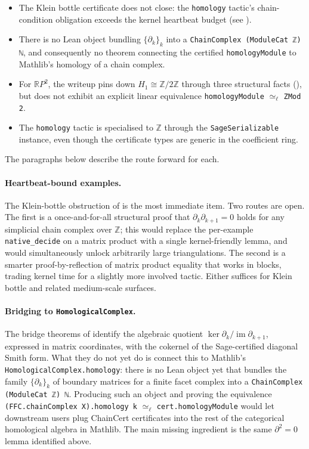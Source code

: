 \documentclass[11pt]{article}
\theoremstyle{plain}
\theoremstyle{definition}
\theoremstyle{remark}
\newcommand{\lean}[1]{\lstinline[language=lean]|#1|}
\begin{document}
\begin{itemize}
\item The Klein bottle certificate does not close: the \lean{homology}
tactic's chain-condition obligation exceeds the kernel heartbeat budget
(see ).
\item There is no Lean object bundling \(\{\partial_k\}_k\) into a
\lean{ChainComplex (ModuleCat ℤ) ℕ}, and consequently no theorem
connecting the certified \lean{homologyModule} to Mathlib's homology
of a chain complex.
\item For \(\mathbb{R}P^2\), the writeup pins down
\(H_1\cong\mathbb{Z}/2\mathbb{Z}\) through three structural facts
(), but does not exhibit an explicit
linear equivalence \lean{homologyModule} \(\simeq_\ell\) \lean{ZMod 2}.
\item The \lean{homology} tactic is specialised to \(\mathbb{Z}\) through
the \lean{SageSerializable} instance, even though the certificate types
are generic in the coefficient ring.
\end{itemize}

The paragraphs below describe the route forward for each.

\paragraph{Heartbeat-bound examples.}
The Klein-bottle obstruction of  is the most
immediate item. Two routes are open. The first is a once-and-for-all
structural proof that \(\partial_k\partial_{k+1} = 0\) holds for any
simplicial chain complex over \(\mathbb{Z}\); this would replace the
per-example \texttt{native\_decide} on a matrix product with a single
kernel-friendly lemma, and would simultaneously unlock arbitrarily large
triangulations. The second is a smarter proof-by-reflection of matrix
product equality that works in blocks, trading kernel time for a slightly
more involved tactic. Either suffices for Klein bottle and related
medium-scale surfaces.

\paragraph{Bridging to \texttt{HomologicalComplex}.}
The bridge theorems of  identify the algebraic quotient
\(\ker\partial_k / \operatorname{im}\partial_{k+1}\), expressed in matrix
coordinates, with the cokernel of the Sage-certified diagonal Smith form.
What they do not yet do is connect this to Mathlib's
\lean{HomologicalComplex.homology}: there is no Lean object yet that
bundles the family \(\{\partial_k\}_k\) of boundary matrices for a finite
facet complex into a \lean{ChainComplex (ModuleCat ℤ) ℕ}. Producing such
an object and proving the equivalence
\lean{(FFC.chainComplex X).homology k} \(\simeq_{\ell}\)
\lean{cert.homologyModule}
would let downstream users plug ChainCert certificates into the rest of
the categorical homological algebra in Mathlib. The main missing
ingredient is the same \(\partial^2 = 0\) lemma identified above.
\end{document}
